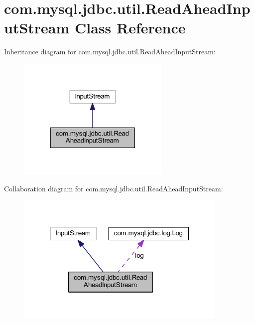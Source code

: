 \hypertarget{classcom_1_1mysql_1_1jdbc_1_1util_1_1_read_ahead_input_stream}{}\section{com.\+mysql.\+jdbc.\+util.\+Read\+Ahead\+Input\+Stream Class Reference}
\label{classcom_1_1mysql_1_1jdbc_1_1util_1_1_read_ahead_input_stream}


Inheritance diagram for com.\+mysql.\+jdbc.\+util.\+Read\+Ahead\+Input\+Stream\+:
\nopagebreak
\begin{figure}[H]
\begin{center}
\leavevmode
\includegraphics[width=207pt]{classcom_1_1mysql_1_1jdbc_1_1util_1_1_read_ahead_input_stream__inherit__graph}
\end{center}
\end{figure}


Collaboration diagram for com.\+mysql.\+jdbc.\+util.\+Read\+Ahead\+Input\+Stream\+:
\nopagebreak
\begin{figure}[H]
\begin{center}
\leavevmode
\includegraphics[width=288pt]{classcom_1_1mysql_1_1jdbc_1_1util_1_1_read_ahead_input_stream__coll__graph}
\end{center}
\end{figure}
